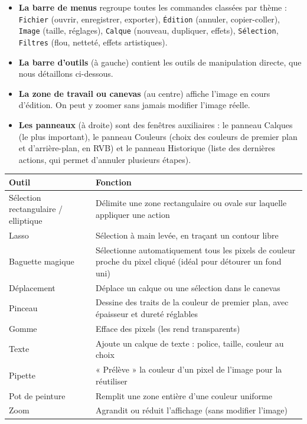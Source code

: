 \documentclass[11pt]{article}
\newcommand{\cle}[1]{{\popxbold\color{popdark}#1}}
\newcounter{popsec}
\newcounter{popsub}
\newcommand{\courssub}[1]{%
  \stepcounter{popsub}%
  \par\vspace{9pt}\noindent{\popxbold\fontsize{11.5}{13}\selectfont\color{popink}{\color{poporange}\thepopsec.\thepopsub}\hspace{6pt}#1}\par\nopagebreak\vspace{4pt}
}
\begin{document}
\begin{itemize}
\item \textbf{La barre de menus} regroupe toutes les commandes classées par thème : \texttt{Fichier} (ouvrir, enregistrer, exporter), \texttt{Édition} (annuler, copier-coller), \texttt{Image} (taille, réglages), \texttt{Calque} (nouveau, dupliquer, effets), \texttt{Sélection}, \texttt{Filtres} (flou, netteté, effets artistiques).
\item \textbf{La barre d'outils} (à gauche) contient les outils de manipulation directe, que nous détaillons ci-dessous.
\item \textbf{La zone de travail ou canevas} (au centre) affiche l'image en cours d'édition. On peut y zoomer sans jamais modifier l'image réelle.
\item \textbf{Les panneaux} (à droite) sont des fenêtres auxiliaires : le panneau \cle{Calques} (le plus important), le panneau \cle{Couleurs} (choix des couleurs de premier plan et d'arrière-plan, en RVB) et le panneau \cle{Historique} (liste des dernières actions, qui permet d'annuler plusieurs étapes).
\end{itemize}

\courssub{Les outils essentiels}

\begin{center}
\begin{tabularx}{\linewidth}{|l|X|}
\hline
\rowcolor{popblueL} \textbf{Outil} & \textbf{Fonction} \\
\hline
Sélection rectangulaire / elliptique & Délimite une zone rectangulaire ou ovale sur laquelle appliquer une action \\
\hline
Lasso & Sélection à main levée, en traçant un contour libre \\
\hline
Baguette magique & Sélectionne automatiquement tous les pixels de couleur proche du pixel cliqué (idéal pour détourer un fond uni) \\
\hline
Déplacement & Déplace un calque ou une sélection dans le canevas \\
\hline
Pinceau & Dessine des traits de la couleur de premier plan, avec épaisseur et dureté réglables \\
\hline
Gomme & Efface des pixels (les rend transparents) \\
\hline
Texte & Ajoute un calque de texte : police, taille, couleur au choix \\
\hline
Pipette & « Prélève » la couleur d'un pixel de l'image pour la réutiliser \\
\hline
Pot de peinture & Remplit une zone entière d'une couleur uniforme \\
\hline
Zoom & Agrandit ou réduit l'affichage (sans modifier l'image) \\
\hline
\end{tabularx}
\end{center}
\end{document}
